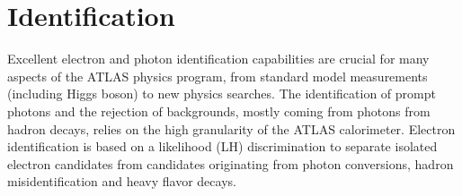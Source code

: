 \documentclass[a4paper, oneside]{book}
\begin{document}
		
		
		
		
		\section{Identification}\label{section:Ident}
		Excellent electron and photon identification capabilities \cite{Identification}\cite{Ident 2} are crucial for many aspects of the ATLAS physics program, from standard model measurements (including Higgs boson) to new physics searches. The identification of prompt photons and the rejection of backgrounds, mostly coming from photons from hadron decays, relies on the high granularity of the ATLAS calorimeter. Electron identification is based on a likelihood (LH) discrimination to separate isolated electron candidates from candidates originating from photon conversions, hadron misidentification and heavy flavor decays. 
\end{document}
